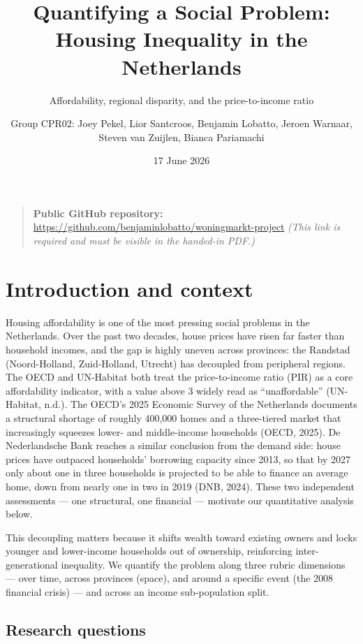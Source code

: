 \documentclass[
]{article}
\title{Quantifying a Social Problem: Housing Inequality in the
Netherlands}
\subtitle{Affordability, regional disparity, and the price-to-income
ratio}
\author{Group CPR02: Joey Pekel, Lior Santcroos, Benjamin Lobatto,
Jeroen Warnaar, Steven van Zuijlen, Bianca Pariamachi}
\date{17 June 2026}
\begin{document}
\maketitle

{
\setcounter{tocdepth}{2}
\tableofcontents
}
\begin{quote}
\textbf{Public GitHub repository:}
\url{https://github.com/benjaminlobatto/woningmarkt-project} \emph{(This
link is required and must be visible in the handed-in PDF.)}
\end{quote}

\section{Introduction and context}\label{introduction-and-context}

Housing affordability is one of the most pressing social problems in the
Netherlands. Over the past two decades, house prices have risen far
faster than household incomes, and the gap is highly uneven across
provinces: the Randstad (Noord-Holland, Zuid-Holland, Utrecht) has
decoupled from peripheral regions. The OECD and UN-Habitat both treat
the price-to-income ratio (PIR) as a core affordability indicator, with
a value above 3 widely read as ``unaffordable'' (UN-Habitat, n.d.). The
OECD's 2025 Economic Survey of the Netherlands documents a structural
shortage of roughly 400,000 homes and a three-tiered market that
increasingly squeezes lower- and middle-income households (OECD, 2025).
De Nederlandsche Bank reaches a similar conclusion from the demand side:
house prices have outpaced households' borrowing capacity since 2013, so
that by 2027 only about one in three households is projected to be able
to finance an average home, down from nearly one in two in 2019 (DNB,
2024). These two independent assessments --- one structural, one
financial --- motivate our quantitative analysis below.

This decoupling matters because it shifts wealth toward existing owners
and locks younger and lower-income households out of ownership,
reinforcing inter-generational inequality. We quantify the problem along
three rubric dimensions --- over time, across provinces (space), and
around a specific event (the 2008 financial crisis) --- and across an
income sub-population split.

\subsection{Research questions}\label{research-questions}
\end{document}
